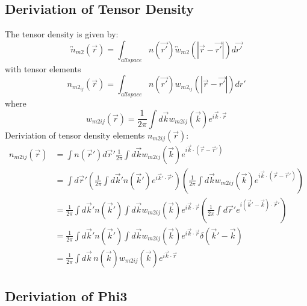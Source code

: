 \documentclass[letterpaper,twocolumn,amsmath,amssymb,prb]{revtex4-1}
\begin{document}
\begin{widetext}
\subsection{Deriviation of Tensor Density} 
\noindent The tensor density is given by:
\begin{equation}{\overleftrightarrow{n}_{m2}(\vec{r})=\int_{allspace}n(\vec{r'})\overleftrightarrow{w}_{m2}(|\vec{r}-\vec{r'}|)d{\vec{r'}}}\end{equation}
with tensor elements  
\begin{displaymath}{n_{m2_{ij}}(\vec{r})=\int_{allspace}n(\vec{r'})w_{m2_{ij}}(|\vec{r}-\vec{r'}|)d{r'}}\end{displaymath} 
where
\begin{equation}{w_{m2ij}(\vec r)= \frac1{2\pi}\int d\vec k w_{m2ij}(\vec k)e^{i\vec k\cdot \vec r}}\end{equation} 
Deriviation of tensor density elements $n_{m2ij}(\vec{r})$:
\begin{align}
    n_{m2ij}(\vec r) &= \int n(\vec r') d\vec r' \frac1{2\pi}\int d\vec k w_{m2ij}(\vec k)e^{i\vec k\cdot (\vec r-\vec r')} \\
    &= \int d\vec r' \left(\frac1{2\pi}\int d\vec k' n(\vec k')e^{i\vec k'\cdot \vec r'}\right) \left(\frac1{2\pi}\int d\vec k w_{m2ij}(\vec k)e^{i\vec k\cdot (\vec r-\vec r')}\right) \\
    &=  \frac1{2\pi}\int d\vec k' n(\vec k') \int d\vec k w_{m2ij}(\vec k)
    e^{i\vec k\cdot \vec r}\left(\frac1{2\pi}\int d\vec r'e^{i(\vec k'-\vec k)\cdot \vec r'}\right)
    \\
    &= \frac1{2\pi}\int d\vec k' n(\vec k') \int d\vec k w_{m2ij}(\vec k)e^{i\vec k\cdot \vec r}\delta(\vec k'-\vec k)
    \\
    &= \frac1{2\pi}\int d\vec k\, n(\vec k) w_{m2ij}(\vec k)e^{i\vec k\cdot \vec r}
  \end{align} 
\[{}\]


\subsection{Deriviation of Phi3}


\end{widetext}
\end{document}
